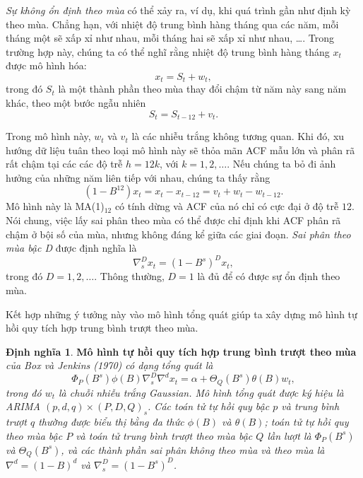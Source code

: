 \documentclass[12pt, a4paper,oneside]{book}
\theoremstyle{definition}
\newtheorem{dn}[theo]{Định nghĩa}
\begin{document}
\textit{Sự không ổn định theo mùa} có thể xảy ra, ví dụ, khi quá trình gần như định kỳ theo mùa. Chẳng hạn, với nhiệt độ trung bình hàng tháng qua các năm, mỗi tháng một sẽ xấp xỉ như nhau, mỗi tháng hai sẽ xấp xỉ như nhau, \dots. Trong trường hợp này, chúng ta có thể nghĩ rằng nhiệt độ trung bình hàng tháng $x_{t}$ được mô hình hóa:
\begin{equation}
x_{t}=S_{t} +w_{t}, \label{ct1.197}
\end{equation}
trong đó $S_{t}$ là một thành phần theo mùa thay đổi chậm từ năm này sang năm khác, theo một bước ngẫu nhiên
\begin{equation}
S_{t}=S_{t-12}+ v_{t}. \label{ct1.198}
\end{equation}

Trong mô hình này, $w_{t}$ và $v_{t}$ là các nhiễu trắng không tương quan. Khi đó, xu hướng dữ liệu tuân theo loại mô hình này sẽ thỏa mãn ACF mẫu lớn và phân rã rất chậm tại các các độ trễ $h = 12k$, với $k = 1, 2, \dots$. Nếu chúng ta bỏ đi ảnh hưởng của những năm liên tiếp với nhau, chúng ta thấy rằng
\begin{equation}
(1-B^{12})x_{t}=x_{t}-x_{t-12}=v_{t}+w_{t}-w_{t-12}. \label{ct1.199}
\end{equation}
Mô hình này là MA(1)$_{12}$ có tính dừng và ACF của nó chỉ có cực đại ở độ trễ $12$. Nói chung, việc lấy sai phân theo mùa có thể được chỉ định khi ACF phân rã chậm ở bội số của mùa, nhưng không đáng kể giữa các giai đoạn. \textit{Sai phân theo mùa bậc D} được định nghĩa là
\begin{equation}
\nabla_{s}^{D}x_{t}=(1-B^{s})^{D}x_{t}, \label{ct1.200}
\end{equation}
trong đó $D = 1, 2, \dots$. Thông thường, $D = 1$ là đủ để có được sự ổn định theo mùa.

Kết hợp những ý tưởng này vào mô hình tổng quát giúp ta xây dựng mô hình tự hồi quy tích hợp trung bình trượt theo mùa.
\begin{dn}\cite{8, 9} \textbf{Mô hình tự hồi quy tích hợp trung bình trượt theo mùa}\textit{ của Box và Jenkins (1970) có dạng tổng quát là
		\begin{equation}
		\Phi_ {P} (B^{s})	\phi(B)\nabla_{s}^{D}\nabla^{d}x_{t}=\alpha + \varTheta_{Q}(B^{s})\theta(B)w_{t}, \label{ct1.201}
		\end{equation}	
		trong đó $w_{t}$ là chuỗi nhiễu trắng Gaussian. Mô hình tổng quát được ký hiệu là ARIMA $(p, d, q) \times (P, D, Q )_{s}$. Các toán tử tự hồi quy bậc $ p $ và trung bình trượt $ q $ thường được biểu thị bằng đa thức $\phi(B)$ và $\theta(B)$; toán tử tự hồi quy theo mùa  bậc $ P $ và toán tử trung bình trượt  theo mùa bậc $ Q $ lần lượt là $\Phi_ {P} (B^{s})$ và $\varTheta_{Q}(B^{s})$, và các thành phần sai phân không theo mùa và theo mùa là  $\nabla^{d}=(1-B)^{d}$ và $\nabla^{D}_{s}=(1-B^{s})^{D}$.}
\end{dn}
\end{document}
